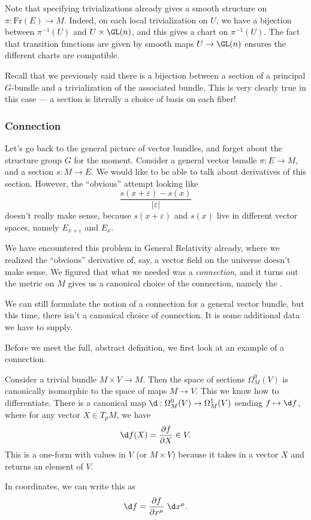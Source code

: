 \documentclass[a4paper]{article}
\begin{document}
\begin{eg}
  Note that specifying trivializations already gives a smooth structure on $\pi: \mathrm{Fr}(E) \to M$. Indeed, on each local trivialization on $U$, we have a bijection between $\pi^{-1}(U)$ and $U \times \GL(n)$, and this gives a chart on $\pi^{-1}(U)$. The fact that transition functions are given by smooth maps $U \to \GL(n)$ ensures the different charts are compatible.

  Recall that we previously said there is a bijection between a section of a principal $G$-bundle and a trivialization of the associated bundle. This is very clearly true in this case --- a section is literally a choice of basis on each fiber!
\end{eg}

\subsubsection*{Connection}
Let's go back to the general picture of vector bundles, and forget about the structure group $G$ for the moment. Consider a general vector bundle $\pi: E \to M$, and a section $s: M \to E$. We would like to be able to talk about derivatives of this section. However, the ``obvious'' attempt looking like
\[
  \frac{s(x + \varepsilon) - s(x)}{|\varepsilon|}
\]
doesn't really make sense, because $s(x + \varepsilon)$ and $s(x)$ live in different vector spaces, namely $E_{x + \varepsilon}$ and $E_x$.

We have encountered this problem in General Relativity already, where we realized the ``obvious'' derivative of, say, a vector field on the universe doesn't make sense. We figured that what we needed was a \emph{connection}, and it turns out the metric on $M$ gives us a canonical choice of the connection, namely the .

We can still formulate the notion of a connection for a general vector bundle, but this time, there isn't a canonical choice of connection. It is some additional data we have to supply.

Before we meet the full, abstract definition, we first look at an example of a connection.
\begin{eg}
  Consider a trivial bundle $M \times V \to M$. Then the space of sections $\Omega^0_M(V)$ is canonically isomorphic to the space of maps $M \to V$. This we know how to differentiate. There is a canonical map $\d: \Omega^0_M(V) \to \Omega^1_M(V)$ sending $f \mapsto \d f$, where for any vector $X \in T_p M$, we have
  \[
    \d f(X) = \frac{\partial f}{\partial X} \in V.
  \]
  This is a one-form with values in $V$ (or $M \times V$) because it takes in a vector $X$ and returns an element of $V$.

  In coordinates, we can write this as
  \[
    \d f = \frac{\partial f}{\partial x^\mu} \;\d x^\mu.
  \]
\end{eg}
\end{document}
